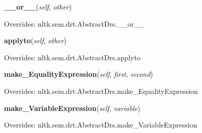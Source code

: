 \hspace{.8\funcindent}\begin{boxedminipage}{\funcwidth}

    \raggedright \textbf{\_\_or\_\_}(\textit{self}, \textit{other})

\setlength{\parskip}{2ex}
\setlength{\parskip}{1ex}
      Overrides: nltk.sem.drt.AbstractDrs.\_\_or\_\_

    \end{boxedminipage}

    \vspace{0.5ex}

\hspace{.8\funcindent}\begin{boxedminipage}{\funcwidth}

    \raggedright \textbf{applyto}(\textit{self}, \textit{other})

\setlength{\parskip}{2ex}
\setlength{\parskip}{1ex}
      Overrides: nltk.sem.drt.AbstractDrs.applyto

    \end{boxedminipage}

    \vspace{0.5ex}

\hspace{.8\funcindent}\begin{boxedminipage}{\funcwidth}

    \raggedright \textbf{make\_EqualityExpression}(\textit{self}, \textit{first}, \textit{second})

\setlength{\parskip}{2ex}
\setlength{\parskip}{1ex}
      Overrides: nltk.sem.drt.AbstractDrs.make\_EqualityExpression

    \end{boxedminipage}

    \vspace{0.5ex}

\hspace{.8\funcindent}\begin{boxedminipage}{\funcwidth}

    \raggedright \textbf{make\_VariableExpression}(\textit{self}, \textit{variable})

\setlength{\parskip}{2ex}
\setlength{\parskip}{1ex}
      Overrides: nltk.sem.drt.AbstractDrs.make\_VariableExpression

    \end{boxedminipage}

    \label{temporaldrt:AbstractDrs:normalize}

